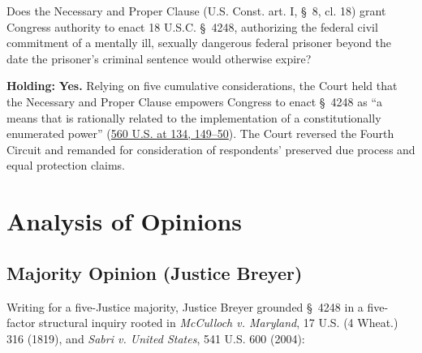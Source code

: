 \documentclass[12pt]{article}
\begin{document}
Does the Necessary and Proper Clause (U.S. Const. art. I, \S~8, cl. 18) grant Congress authority to enact 18 U.S.C. \S~4248, authorizing the federal civil commitment of a mentally ill, sexually dangerous federal prisoner beyond the date the prisoner's criminal sentence would otherwise expire?

\textbf{Holding:} \textbf{Yes.} Relying on five cumulative considerations, the Court held that the Necessary and Proper Clause empowers Congress to enact \S~4248 as ``a means that is rationally related to the implementation of a constitutionally enumerated power'' (\href{https://supreme.justia.com/cases/federal/us/560/126/}{560 U.S. at 134, 149--50}). The Court reversed the Fourth Circuit and remanded for consideration of respondents' preserved due process and equal protection claims.

\section{Analysis of Opinions}
\subsection{Majority Opinion (Justice Breyer)}

Writing for a five-Justice majority, Justice Breyer grounded \S~4248 in a five-factor structural inquiry rooted in \textit{McCulloch v. Maryland}, 17 U.S. (4 Wheat.) 316 (1819), and \textit{Sabri v. United States}, 541 U.S. 600 (2004):
\end{document}
